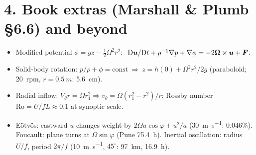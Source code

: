 \documentclass[10pt]{article}
\begin{document}
\section*{4. Book extras (Marshall \& Plumb \S6.6) and beyond}
\begin{itemize}[leftmargin=*,itemsep=1pt]
\item Modified potential $\phi=gz-\tfrac12\Omega^2r^2$: $\ \mathrm{D}\bm{u}/\mathrm{D} t+\rho^{-1}\nabla p+\nabla\phi=-2\bm\Omega\times\bm{u}+\bm{F}$.
\item Solid-body rotation: $p/\rho+\phi=\text{const}\ \Rightarrow\ \boxed{z=h(0)+\Omega^2r^2/2g}$ (paraboloid; \SI{20}{rpm}, $r=\SI{0.5}{m}$: \SI{5.6}{cm}).
\item Radial inflow: $V_\theta r=\Omega r_1^2\Rightarrow v_\theta=\Omega(r_1^2-r^2)/r$; Rossby number $\mathrm{Ro}=U/fL\approx0.1$ at synoptic scale.
\item Eötvös: eastward $u$ changes weight by $2\Omega u\cos\varphi+u^2/a$ (\SI{30}{\metre\per\second}: $0.046\%$). Foucault: plane turns at $\Omega\sin\varphi$ (Pune \SI{75.4}{h}). Inertial oscillation: radius $U/f$, period $2\pi/f$ (\SI{10}{\metre\per\second}, $45^\circ$: \SI{97}{km}, \SI{16.9}{h}).
\end{itemize}
\end{document}
